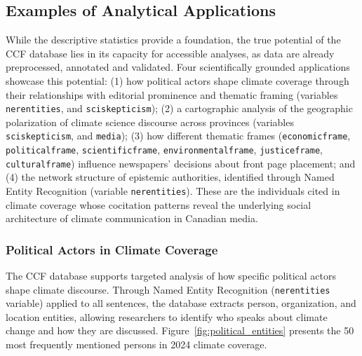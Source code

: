 \documentclass[12pt]{article}
\renewcommand\_{\texttt{\detokenize{_}\allowbreak}}
\begin{document}
\subsection{Examples of Analytical Applications}
\label{subsec:analytical_applications}

While the descriptive statistics provide a foundation, the true potential of the CCF database lies in its capacity for accessible analyses, as data are already preprocessed, annotated and validated. Four scientifically grounded applications showcase this potential: (1) how political actors shape climate coverage through their relationships with editorial prominence and thematic framing (variables \texttt{ner\_entities}, and \texttt{sci\_skepticism}); (2) a cartographic analysis of the geographic polarization of climate science discourse across provinces (variables \texttt{sci\_skepticism}, and \texttt{media}); (3) how different thematic frames (\texttt{economic\_frame}, \texttt{political\_frame}, \texttt{scientific\_frame}, \texttt{environmental\_frame}, \texttt{justice\_frame}, \texttt{cultural\_frame}) influence newspapers' decisions about front page placement; and (4) the network structure of epistemic authorities, identified through Named Entity Recognition (variable \texttt{ner\_entities}). These are the individuals cited in climate coverage whose cocitation patterns reveal the underlying social architecture of climate communication in Canadian media.


\subsubsection{Political Actors in Climate Coverage}

The CCF database supports targeted analysis of how specific political actors shape climate discourse. Through Named Entity Recognition (\texttt{ner\_entities} variable) applied to all sentences, the database extracts person, organization, and location entities, allowing researchers to identify who speaks about climate change and how they are discussed. Figure~\ref{fig:political_entities} presents the 50 most frequently mentioned persons in 2024 climate coverage.
\end{document}
